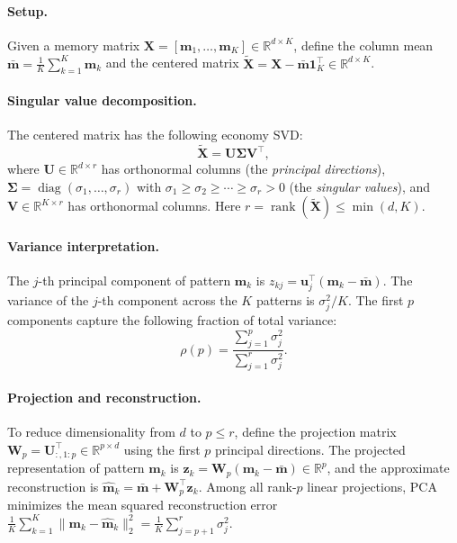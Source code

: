 \paragraph{Setup.}
Given a memory matrix $\mathbf{X} = [\mathbf{m}_1,\dots,\mathbf{m}_K] \in \mathbb{R}^{d \times K}$, define the column mean $\bar{\mathbf{m}} = \frac{1}{K}\sum_{k=1}^{K}\mathbf{m}_k$ and the centered matrix $\tilde{\mathbf{X}} = \mathbf{X} - \bar{\mathbf{m}}\mathbf{1}_K^\top \in \mathbb{R}^{d \times K}$.

\paragraph{Singular value decomposition.}
The centered matrix has the following economy SVD:
\begin{equation}\label{eq:pca-svd}
    \tilde{\mathbf{X}} = \mathbf{U}\boldsymbol{\Sigma}\mathbf{V}^\top,
\end{equation}
where $\mathbf{U} \in \mathbb{R}^{d \times r}$ has orthonormal columns (the \emph{principal directions}), $\boldsymbol{\Sigma} = \operatorname{diag}(\sigma_1,\dots,\sigma_r)$ with $\sigma_1 \ge \sigma_2 \ge \cdots \ge \sigma_r > 0$ (the \emph{singular values}), and $\mathbf{V} \in \mathbb{R}^{K \times r}$ has orthonormal columns. Here $r = \operatorname{rank}(\tilde{\mathbf{X}}) \le \min(d, K)$.

\paragraph{Variance interpretation.}
The $j$-th principal component of pattern $\mathbf{m}_k$ is $z_{kj} = \mathbf{u}_j^\top(\mathbf{m}_k - \bar{\mathbf{m}})$. The variance of the $j$-th component across the $K$ patterns is $\sigma_j^2 / K$. The first $p$ components capture the following fraction of total variance:
\begin{equation}\label{eq:pca-variance}
    \rho(p) = \frac{\sum_{j=1}^{p}\sigma_j^2}{\sum_{j=1}^{r}\sigma_j^2}.
\end{equation}

\paragraph{Projection and reconstruction.}
To reduce dimensionality from $d$ to $p \le r$, define the projection matrix $\mathbf{W}_p = \mathbf{U}_{:,1:p}^\top \in \mathbb{R}^{p \times d}$ using the first $p$ principal directions. The projected representation of pattern $\mathbf{m}_k$ is $\mathbf{z}_k = \mathbf{W}_p(\mathbf{m}_k - \bar{\mathbf{m}}) \in \mathbb{R}^p$, and the approximate reconstruction is $\hat{\mathbf{m}}_k = \bar{\mathbf{m}} + \mathbf{W}_p^\top\mathbf{z}_k$. Among all rank-$p$ linear projections, PCA minimizes the mean squared reconstruction error $\frac{1}{K}\sum_{k=1}^{K}\|\mathbf{m}_k - \hat{\mathbf{m}}_k\|_2^2 = \frac{1}{K}\sum_{j=p+1}^{r}\sigma_j^2$.

